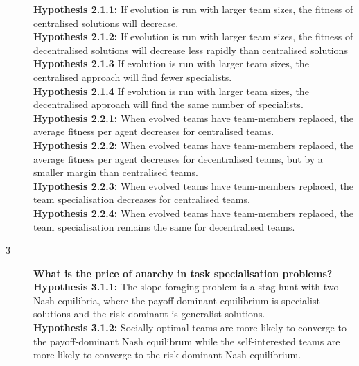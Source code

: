 \documentclass[12pt]{article}
\begin{document}
\begin{description}
\textbf{Hypothesis 2.1.1:} If evolution is run with larger team sizes, the fitness of centralised solutions will decrease.\\

\textbf{Hypothesis 2.1.2:} If evolution is run with larger team sizes, the fitness of decentralised solutions will decrease less rapidly than centralised solutions\\

\textbf{Hypothesis 2.1.3} If evolution is run with larger team sizes, the centralised approach will find fewer specialists.\\

\textbf{Hypothesis 2.1.4} If evolution is run with larger team sizes, the decentralised approach will find the same number of specialists.\\

\textbf{Hypothesis 2.2.1:} When evolved teams have team-members replaced, the average fitness per agent decreases for centralised teams.\\

\textbf{Hypothesis 2.2.2:} When evolved teams have team-members replaced, the average fitness per agent decreases for decentralised teams, but by a smaller margin than centralised teams.\\

\textbf{Hypothesis 2.2.3:} When evolved teams have team-members replaced, the team specialisation decreases for centralised teams.\\

\textbf{Hypothesis 2.2.4:} When evolved teams have team-members replaced, the team specialisation remains the same for decentralised teams.\\

\item[3] \textbf{What is the price of anarchy in task specialisation problems?}\\

\textbf{Hypothesis 3.1.1:} The slope foraging problem is a stag hunt with two Nash equilibria, where the payoff-dominant equilibrium is specialist solutions and the risk-dominant is generalist solutions.\\

\textbf{Hypothesis 3.1.2:} Socially optimal teams are more likely to converge to the payoff-dominant Nash equilibrum while the self-interested teams are more likely to converge to the risk-dominant Nash equilibrium.\\

\end{description}
\end{document}
